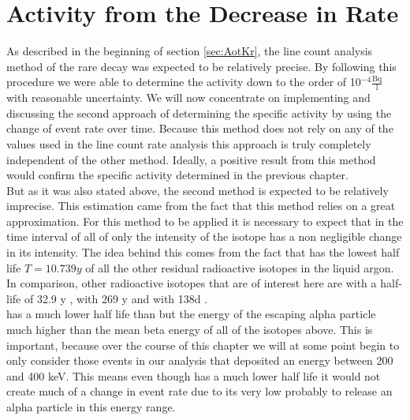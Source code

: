 \chapter{Activity from the Decrease in Rate}
\label{sec:SAfromDecrease}

As described in the beginning of section \ref{sec:AotKr}, the line count analysis method of the rare \Kr decay was expected to be relatively precise.
By following this procedure we were able to determine the activity down to the order of 10$^{-4} \frac{\mathrm{Bq}}{\mathrm{l}}$ with reasonable uncertainty.
We will now concentrate on implementing and discussing the second approach of determining the specific activity by using the change of event rate over time.
Because this method does not rely on any of the values used in the line count rate analysis this approach is truly completely independent of the other method.
Ideally, a positive result from this method would confirm the specific activity determined in the previous chapter. 
\\

But as it was also stated above, the second method is expected to be relatively imprecise.  
This estimation came from the fact that this method relies on a great approximation.
For this method to be applied it is necessary to expect that in the time interval of all of \PII only the intensity of the \Kr isotope has a non negligible change in its intensity.
The idea behind this comes from the fact that \Kr has the lowest half life \(T = 10.739\unit{y}\) of all the other residual radioactive isotopes in the liquid argon.
In comparison, other radioactive isotopes that are of interest here are  with a half-life of 32.9 y \cite{chen_nuclear_2016},  with 269 y \cite{singh_nuclear_2006} and  with 138d \cite{kondev_nuclear_2008}. 
\\

 has a much lower half life than \Kr but the energy of the escaping alpha particle much higher than the mean beta energy of all of the isotopes above.
This is important, because over the course of this chapter we will at some point begin to only consider those events in our analysis that deposited an energy between 200 and 400 keV.   
This means even though  has a much lower half life it would not create much of a change in event rate due to its very low probably to release an alpha particle in this energy range.
\\

